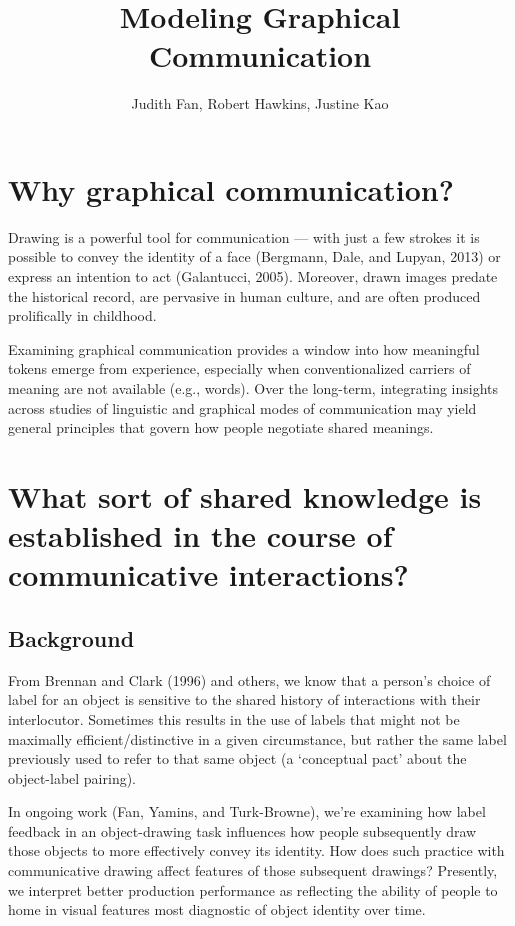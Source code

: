 \documentclass[12pt]{article}
\title{\textbf{Modeling Graphical Communication}}
\author{Judith Fan, Robert Hawkins, Justine Kao}
\begin{document}
\maketitle %

\section{Why graphical communication?}

Drawing is a powerful tool for communication --- with just a few strokes it is possible to convey the identity of a face (Bergmann, Dale, and Lupyan, 2013) or express an intention to act (Galantucci, 2005). Moreover, drawn images predate the historical record, are pervasive in human culture, and are often produced prolifically in childhood. 

Examining graphical communication provides a window into how meaningful tokens emerge from experience, especially when conventionalized carriers of meaning are not available (e.g., words). Over the long-term, integrating insights across studies of linguistic and graphical modes of communication may yield general principles that govern how people negotiate shared meanings.  

\section{What sort of shared knowledge is established in the course of communicative interactions?}

\subsection{Background}

From Brennan and Clark (1996) and others, we know that a person’s choice of label for an object is sensitive to the shared history of interactions with their interlocutor. Sometimes this results in the use of labels that might not be maximally efficient/distinctive in a given circumstance, but rather the same label previously used to refer to that same object (a ‘conceptual pact’ about the object-label pairing). 

In ongoing work (Fan, Yamins, and Turk-Browne), we’re examining how label feedback in an object-drawing task influences how people subsequently draw those objects to more effectively convey its identity. How does such practice with communicative drawing affect features of those subsequent drawings? Presently, we interpret better production performance as reflecting the ability of people to home in visual features most diagnostic of object identity over time. 
\end{document}
